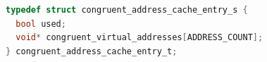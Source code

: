 \begin{lstlisting}[language=c,caption=Eviction set structure, label=lst:eviction-set-structure]
typedef struct congruent_address_cache_entry_s {
  bool used;
  void* congruent_virtual_addresses[ADDRESS_COUNT];
} congruent_address_cache_entry_t;
\end{lstlisting}
